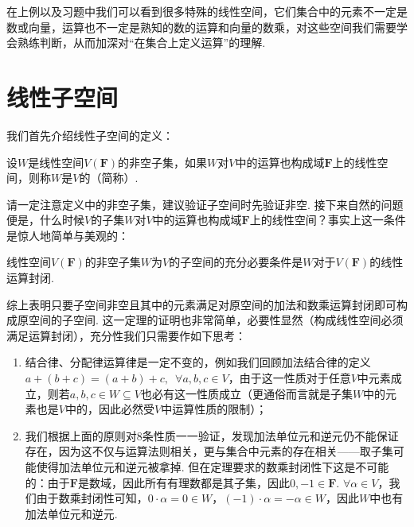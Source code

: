 在上例以及习题中我们可以看到很多特殊的线性空间，它们集合中的元素不一定是数或向量，运算也不一定是熟知的数的运算和向量的数乘，对这些空间我们需要学会熟练判断，从而加深对``在集合上定义运算''的理解.

\section{线性子空间}

我们首先介绍线性子空间的定义：
\begin{definition}[线性子空间] 
    设$W$是线性空间$V(\mathbf{F})$的非空子集，如果$W$对$V$中的运算也构成域$\mathbf{F}$上的线性空间，则称$W$是$V$的（简称）.
\end{definition}

请一定注意定义中的非空子集，建议验证子空间时先验证非空. 接下来自然的问题便是，什么时候$V$的子集$W$对$V$中的运算也构成域$\mathbf{F}$上的线性空间？事实上这一条件是惊人地简单与美观的：
\begin{theorem}\label{thm:2:子空间判别}
    线性空间$V(\mathbf{F})$的非空子集$W$为$V$的子空间的充分必要条件是$W$对于$V(\mathbf{F})$的线性运算封闭.
\end{theorem}

综上表明只要子空间非空且其中的元素满足对原空间的加法和数乘运算封闭即可构成原空间的子空间. 这一定理的证明也非常简单，必要性显然（构成线性空间必须满足运算封闭），充分性我们只需要作如下思考：
\begin{enumerate}
    \item 结合律、分配律运算律是一定不变的，例如我们回顾加法结合律的定义$a+(b+c)=(a+b)+c,\enspace\forall a,b,c\in V$，由于这一性质对于任意$V$中元素成立，则若$a,b,c\in W\subseteq V$也必有这一性质成立（更通俗而言就是子集$W$中的元素也是$V$中的，因此必然受$V$中运算性质的限制）；

    \item 我们根据上面的原则对8条性质一一验证，发现加法单位元和逆元仍不能保证存在，因为这不仅与运算法则相关，更与集合中元素的存在相关——取子集可能使得加法单位元和逆元被拿掉. 但在定理要求的数乘封闭性下这是不可能的：由于$\mathbf{F}$是数域，因此所有有理数都是其子集，因此$0,-1\in\mathbf{F}$. $\forall \alpha\in V$，我们由于数乘封闭性可知，$0\cdot\alpha=0\in W$，$(-1)\cdot\alpha=-\alpha\in W$，因此$W$中也有加法单位元和逆元.
\end{enumerate}

